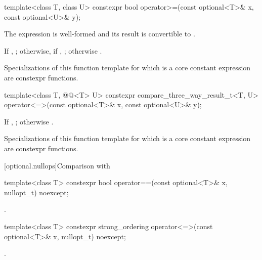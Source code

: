 %
\begin{itemdecl}
template<class T, class U> constexpr bool operator>=(const optional<T>& x, const optional<U>& y);
\end{itemdecl}

\begin{itemdescr}
\pnum
\constraints
The expression  is well-formed and
its result is convertible to .

\pnum
\returns
If , ;
otherwise, if , ;
otherwise .

\pnum
\remarks
Specializations of this function template
for which  is a core constant expression
are constexpr functions.
\end{itemdescr}

%
\begin{itemdecl}
template<class T, @@<T> U>
  constexpr compare_three_way_result_t<T, U>
    operator<=>(const optional<T>& x, const optional<U>& y);
\end{itemdecl}

\begin{itemdescr}
\pnum
\returns
If , ; otherwise .

\pnum
\remarks
Specializations of this function template
for which  is a core constant expression
are constexpr functions.
\end{itemdescr}

[optional.nullops]{Comparison with }

%
\begin{itemdecl}
template<class T> constexpr bool operator==(const optional<T>& x, nullopt_t) noexcept;
\end{itemdecl}

\begin{itemdescr}
\pnum
\returns
{}.
\end{itemdescr}

%
\begin{itemdecl}
template<class T> constexpr strong_ordering operator<=>(const optional<T>& x, nullopt_t) noexcept;
\end{itemdecl}

\begin{itemdescr}
\pnum
\returns
{}.
\end{itemdescr}


